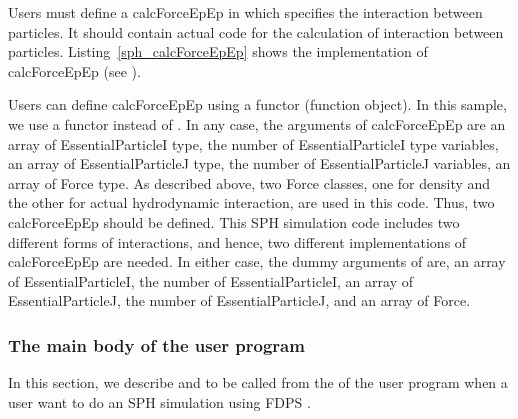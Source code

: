 Users must define a \procedure \textsf{calcForceEpEp} in \progLangName which specifies the interaction between particles. It should contain actual code for the calculation of interaction between particles. Listing~\ref{sph_calcForceEpEp} shows the implementation of \textsf{calcForceEpEp} (see ).

\ifCpp %

\endifCpp
\ifFtn %

\endifFtn
\ifC %

\endifC

\ifCpp %
Users can define \textsf{calcForceEpEp} using a functor (function object). In this sample, we use a functor instead of \procedure. In any case, the arguments of \textsf{calcForceEpEp} are an array of \textsf{EssentialParticleI} type, the number of \textsf{EssentialParticleI} type variables, an array of \textsf{EssentialParticleJ} type, the number of \textsf{EssentialParticleJ} variables, an array of \textsf{Force} type. As described above, two \textsf{Force} classes, one for density and the other for actual hydrodynamic interaction, are used in this code. Thus, two \textsf{calcForceEpEp} should be defined.
\endifCpp
\ifIF %
This SPH simulation code includes two different forms of interactions, and hence, two different implementations of \textsf{calcForceEpEp} are needed. In either case, the dummy arguments of \procedure are, an array of \textsf{EssentialParticleI}, the number of \textsf{EssentialParticleI}, an array of \textsf{EssentialParticleJ}, the number of \textsf{EssentialParticleJ}, and an array of \textsf{Force}.
\endifIF

\subsubsection{The main body of the user program}
In this section, we describe \procedures and \functions to be called from the \mainFunc of the user program when a user want to do an SPH simulation using FDPS .


